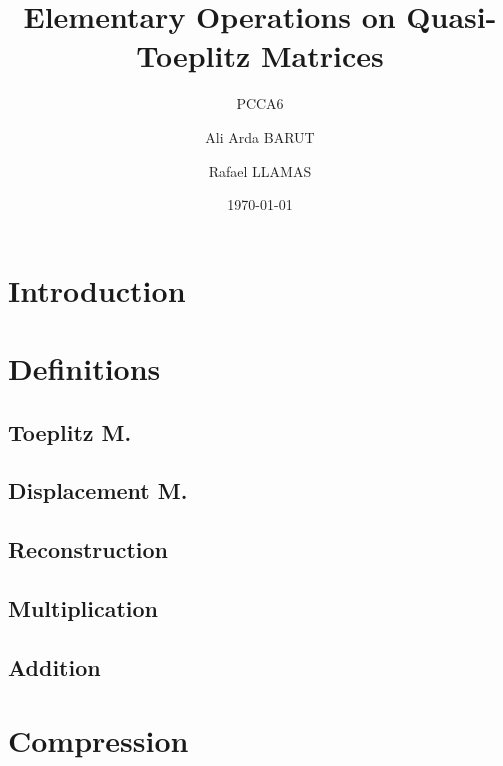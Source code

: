 \documentclass[aspectratio=169]{beamer}
\title[Project CCA 6]{Elementary Operations on Quasi-Toeplitz Matrices}
\subtitle{PCCA6}
\author[A. Barut, R. LLamas]{Ali Arda BARUT \and Rafael LLAMAS}
\date{\today}
\begin{document}
\begin{frame}
  \titlepage
\end{frame}

\section{Introduction}

\section{Definitions}
\subsection{Toeplitz M.}


\subsection{Displacement M.}



\subsection{Reconstruction}




\subsection{Multiplication}



\subsection{Addition}




\section{Compression}



\end{document}
